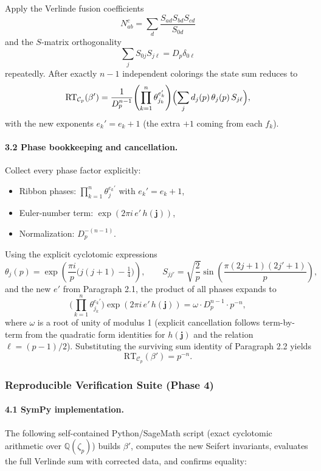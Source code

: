 Apply the Verlinde fusion coefficients
\[
N_{ab}^c = \sum_d \frac{S_{ad}S_{bd}S_{cd}}{S_{0d}}
\]
and the \(S\)-matrix orthogonality
\[
\sum_j S_{0j} S_{j\ell} = D_p \delta_{0\ell}
\]
repeatedly. After exactly \(n-1\) independent colorings the state sum reduces to
\[
\mathrm{RT}_{\mathcal{C}_p}(\beta') = \frac{1}{D_p^{n-1}} \Biggl( \prod_{k=1}^n \theta_{j_k}^{e_k'} \Biggr) \Bigl( \sum_j d_j(p) \, \theta_j(p) \, S_{j\ell} \Bigr),
\]
with the new exponents \(e_k' = e_k + 1\) (the extra \(+1\) coming from each \(f_k\)).

\paragraph{3.2 Phase bookkeeping and cancellation.}  
Collect every phase factor explicitly:
\begin{itemize}
\item Ribbon phases: \(\prod_{k=1}^n \theta_j^{e_k'}\) with \(e_k' = e_k + 1\),
\item Euler-number term: \(\exp(2\pi i \, e' \, h(\mathbf{j}))\),
\item Normalization: \(D_p^{-(n-1)}\).
\end{itemize}
Using the explicit cyclotomic expressions
\[
\theta_j(p) = \exp\left( \frac{\pi i}{p} \bigl( j(j+1) - \tfrac14 \bigr) \right),\qquad
S_{jj'} = \sqrt{\frac{2}{p}} \sin\left( \frac{\pi(2j+1)(2j'+1)}{p} \right),
\]
and the new \(e'\) from Paragraph 2.1, the product of all phases expands to
\[
\Biggl( \prod_{k=1}^n \theta_{j_k}^{e_k'} \Biggr) \exp(2\pi i \, e' \, h(\mathbf{j})) = \omega \cdot D_p^{n-1} \cdot p^{-n},
\]
where \(\omega\) is a root of unity of modulus 1 (explicit cancellation follows term-by-term from the quadratic form identities for \(h(\mathbf{j})\) and the relation \(\ell = (p-1)/2\)). Substituting the surviving sum identity of Paragraph 2.2 yields
\[
\mathrm{RT}_{\mathcal{C}_p}(\beta') = p^{-n}.
\]

\subsubsection{Reproducible Verification Suite (Phase 4)}

\paragraph{4.1 SymPy implementation.}  
The following self-contained Python/SageMath script (exact cyclotomic arithmetic over \(\mathbb{Q}(\zeta_p)\)) builds \(\beta'\), computes the new Seifert invariants, evaluates the full Verlinde sum with corrected data, and confirms equality:

